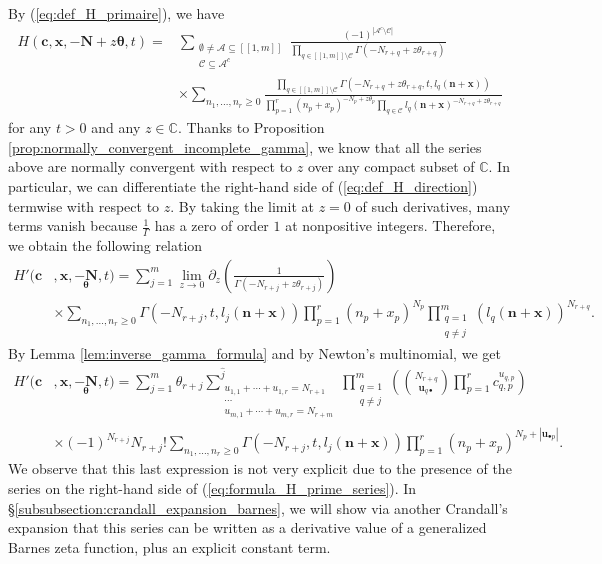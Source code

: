 \documentclass[a4paper]{amsart}
\theoremstyle{remark}
\theoremstyle{definition}
\begin{document}
By (\ref{eq:def_H_primaire}), we have
\begin{align}
    H(\mathbf{c},\mathbf{x},-\mathbf{N}+z\bm{\theta},t) =& \sum_{\substack{\emptyset \neq \mathcal{A} \subseteq [\![1,m]\!] \\ \mathcal{C} \subseteq \mathcal{A}^c}} \frac{(-1)^{|\mathcal{A}^c \setminus \mathcal{C}|}}{\prod_{q \in [\![1,m]\!] \setminus \mathcal{C}} \Gamma(-N_{r+q}+z\theta_{r+q})} \label{eq:def_H_direction} \\
    & \times \sum_{n_1,\ldots,n_r \geq 0} \frac{\prod_{q \in [\![ 1,m ]\!] \setminus \mathcal{C}} \Gamma(-N_{r+q}+z\theta_{r+q},t,l_q(\mathbf{n}+\mathbf{x}))}{\prod_{p=1}^{r} (n_p+x_p)^{-N_p+z\theta_p} \prod_{q \in \mathcal{C}} l_q(\mathbf{n}+\mathbf{x})^{-N_{r+q}+z\theta_{r+q}}} \nonumber
\end{align}
for any $t>0$ and any $z \in \mathbb{C}$. Thanks to Proposition \ref{prop:normally_convergent_incomplete_gamma}, we know that all the series above are normally convergent with respect to $z$ over any compact subset of $\mathbb{C}$. In particular, we can differentiate the right-hand side of (\ref{eq:def_H_direction}) termwise with respect to $z$. By taking the limit at $z=0$ of such derivatives, many terms vanish because $\frac{1}{\Gamma}$ has a zero of order $1$ at nonpositive integers. Therefore, we obtain the following relation
\begin{align*}
    H'(\mathbf{c}&,\mathbf{x},\underset{\bm{\theta}}{-\mathbf{N}},t) = \sum_{j=1}^{m} \lim_{z \to 0} \partial_z \left( \frac{1}{\Gamma(-N_{r+j}+z\theta_{r+j})} \right) \nonumber \\
    & \times \sum_{n_1,\ldots,n_r \geq 0} \Gamma(-N_{r+j},t,l_j(\mathbf{n}+\mathbf{x})) \prod_{p=1}^{r} (n_p+x_p)^{N_p} \prod_{\substack{q=1 \\ q \neq j}}^m (l_q(\mathbf{n}+\mathbf{x}))^{N_{r+q}}. \nonumber
\end{align*}
By Lemma \ref{lem:inverse_gamma_formula} and by Newton's multinomial, we get
\begin{align}
    H'(\mathbf{c}&,\mathbf{x},\underset{\bm{\theta}}{-\mathbf{N}},t) = \sum_{j=1}^m \theta_{r+j} \sum^{\widehat{j}}_{\substack{u_{1,1}+\cdots+u_{1,r}=N_{r+1} \\ \cdots \\ u_{m,1}+\cdots+u_{m,r}=N_{r+m}}} \prod_{\substack{ q=1 \\ q \neq j}}^{m} \left( \binom{N_{r+q}}{\mathbf{u}_{q \bullet}} \prod_{p=1}^{r} c_{q,p}^{u_{q,p}} \right) \label{eq:formula_H_prime_series} \\
    & \times (-1)^{N_{r+j}}N_{r+j}! \sum_{n_1,\ldots,n_{r} \geq 0} \Gamma(-N_{r+j},t,l_j(\mathbf{n}+\mathbf{x})) \prod_{p=1}^{r} (n_p+x_p)^{N_p+|\mathbf{u}_{\bullet p}|}. \nonumber
\end{align}
We observe that this last expression is not very explicit due to the presence of the series on the right-hand side of (\ref{eq:formula_H_prime_series}). In §\ref{subsubsection:crandall_expansion_barnes}, we will show via another Crandall's expansion that this series can be written as a derivative value of a generalized Barnes zeta function, plus an explicit constant term.
\end{document}
